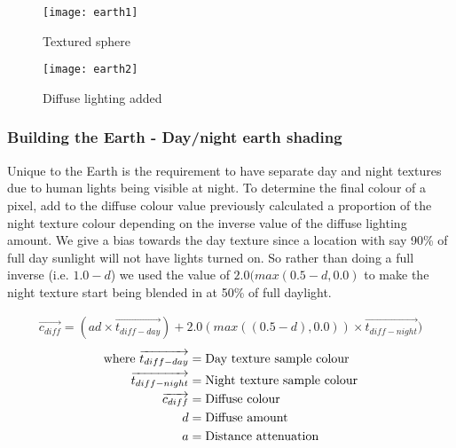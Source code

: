 \begin{figure}[!htbp]
\centering
\begin{minipage}{.5\textwidth}
  \centering
  \texttt{[image: earth1]}
  \caption{Textured sphere}
  \label{fig:earth1}
\end{minipage}%
\begin{minipage}{.5\textwidth}
  \centering
  \texttt{[image: earth2]}
  \caption{Diffuse lighting added}
  \label{fig:earth2}
\end{minipage}
\end{figure}

\pagebreak
\subsubsection{Building the Earth - Day/night earth shading}

Unique to the Earth is the requirement to have separate day and night textures due to human lights being visible at night. 
To determine the final colour of a pixel, add to the diffuse colour value previously calculated 
a proportion of the night texture colour depending on the inverse value of the diffuse lighting amount. We give a bias towards the day texture since a location with say 90\% of full day sunlight will not have lights turned on. 
So rather than doing a full inverse (i.e. $1.0-d$) we used the value of $2.0(max(0.5-d,0.0)$ to make the night texture start being blended in at 50\% of full daylight.

\vspace{-10pt} 
\begin{align}
\overrightarrow{c_{diff}} = (ad \times \overrightarrow{t_{diff-day}})+2.0(max((0.5-d), 0.0))\times \overrightarrow{t_{diff-night}})
\end{align}
\vspace{-40pt} 
\begin{align*}
\text{where}~
\overrightarrow{t_{diff-day}} &= \text{Day texture sample colour} \notag\\
\overrightarrow{t_{diff-night}} &= \text{Night texture sample colour} \notag\\
\overrightarrow{c_{diff}} &= \text{Diffuse colour} \notag\\
d &= \text{Diffuse amount} \notag\\
a  &= \text{Distance attenuation} \notag\\
\end{align*}
\vspace{-45pt} 

